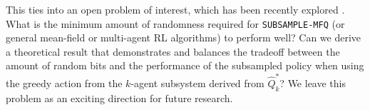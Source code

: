 \documentclass{article}
\theoremstyle{plain}
\theoremstyle{definition}
\begin{document}
This ties into an open problem of interest, which has been recently explored \citep{larsen2024derandomizing}. What is the minimum amount of randomness required for \texttt{SUBSAMPLE-MFQ} (or general mean-field or multi-agent RL algorithms) to perform well? Can we derive a theoretical result that demonstrates and balances the tradeoff between the amount of random bits and the performance of the subsampled policy when using the greedy action from the $k$-agent subsystem derived from $\hat{Q}_k^*$? We leave this problem as an exciting direction for future research.


% 
\end{document}

